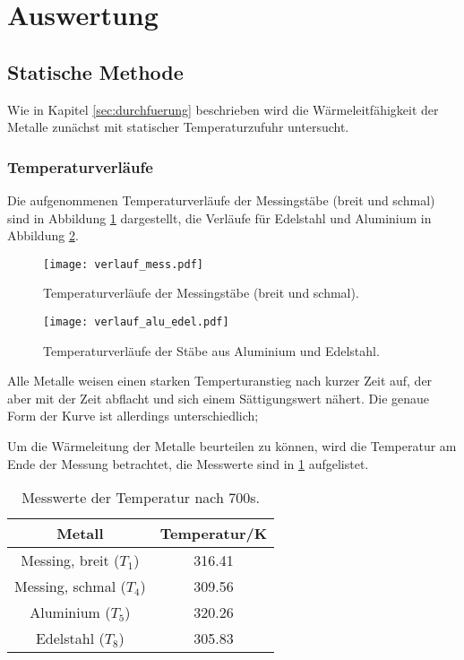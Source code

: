 \section{Auswertung}
\label{sec:Auswertung}

\subsection{Statische Methode}
  Wie in Kapitel \ref{sec:durchfuerung} beschrieben wird die Wärmeleitfähigkeit der Metalle zunächst mit statischer Temperaturzufuhr untersucht.

  \subsubsection{Temperaturverläufe}
  Die aufgenommenen Temperaturverläufe der Messingstäbe (breit und schmal) sind in Abbildung \ref{fig:messingstat} dargestellt, die Verläufe für Edelstahl und
  Aluminium in Abbildung \ref{fig:aluedelstat}.\\


  \begin{figure}
    \centering
    \texttt{[image: verlauf\_mess.pdf]}
    \caption{Temperaturverläufe der Messingstäbe (breit und schmal).}
    \label{fig:messingstat}
  \end{figure}

  \begin{figure}
    \centering
    \texttt{[image: verlauf\_alu\_edel.pdf]}
    \caption{Temperaturverläufe der Stäbe aus Aluminium und Edelstahl.}
    \label{fig:aluedelstat}
  \end{figure}
  \FloatBarrier

  \noindent Alle Metalle weisen einen starken Temperturanstieg nach kurzer Zeit auf, der aber mit der Zeit abflacht und sich einem Sättigungswert nähert. 
  Die genaue Form der Kurve ist allerdings unterschiedlich; 

  Um die Wärmeleitung der Metalle beurteilen zu können, wird die Temperatur am Ende der Messung betrachtet, die Messwerte sind in \ref{tab:setecientos} 
  aufgelistet.

  \begin{table}
    \centering
    \caption{Messwerte der Temperatur nach 700s.}
    \label{tab:setecientos}
    \begin{tabular}{c c}
      \toprule
      Metall & Temperatur/K \\
      \midrule
      Messing, breit ($T_1$) & 316.41 \\
      Messing, schmal ($T_4$)& 309.56\\
      Aluminium ($T_5$)& 320.26\\
      Edelstahl ($T_8$)& 305.83\\
      \bottomrule
    \end{tabular}
  \end{table}
  \FloatBarrier

